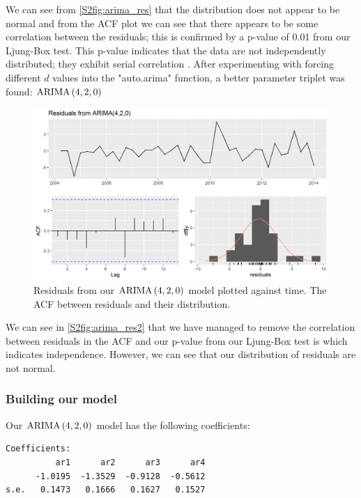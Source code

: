 We can see from \autoref{S2fig:arima_res} that the distribution does not appear to be normal and from the ACF plot we can see that there appears to be some correlation between the residuals; this is confirmed by a p-value of 0.01 from our Ljung-Box test. This p-value indicates that the data are not independently distributed; they exhibit serial correlation \cite{10.1093/biomet/65.2.297}.
\nline
After experimenting with forcing different $d$ values into the "auto.arima" function, a better parameter triplet was found: $\text{ARIMA}\left(4,2,0\right)$

\begin{figure}[H]
    \centering
    \includegraphics[width=\sTwoRes\textwidth]{Sections/ARIMA/Plots/auto__arima_res2.png}
    \caption{Residuals from our $\text{ARIMA}\left(4,2,0\right)$ model plotted against time. The ACF between residuals and their distribution.}
    \label{S2fig:arima_res2}
\end{figure}

We can see in \autoref{S2fig:arima_res2} that we have managed to remove the correlation between residuals in the ACF and our p-value from our Ljung-Box test is  which indicates independence. However, we can see that our distribution of residuals are not normal.


\subsubsection{Building our model}

Our $\text{ARIMA}\left(4,2,0\right)$ model has the following coefficients:

\begin{lstlisting}[caption={ARIMA(4,2,0) Coefficients}]
Coefficients:
          ar1      ar2      ar3      ar4
      -1.0195  -1.3529  -0.9128  -0.5612
s.e.   0.1473   0.1666   0.1627   0.1527
\end{lstlisting}

